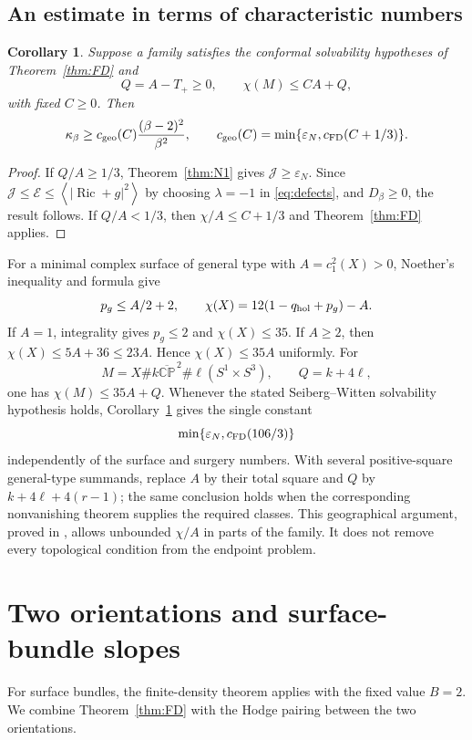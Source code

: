 \documentclass[11pt,a4paper]{article}
\newtheorem{corollary}[theorem]{Corollary}
\theoremstyle{definition}
\theoremstyle{remark}
\newcommand{\Ric}{\operatorname{Ric}}
\newcommand{\J}{\mathcal J}
\newcommand{\E}{\mathcal E}
\newcommand{\av}[1]{\left\langle#1\right\rangle}
\begin{document}
\subsection{An estimate in terms of characteristic numbers}
\begin{corollary}\label{cor:GEO}
Suppose a family satisfies the conformal solvability hypotheses of Theorem~\ref{thm:FD} and
\[
 Q=A-T_+\ge0,\qquad \chi(M)\le CA+Q,
\]
with fixed $C\ge0$. Then
\begin{equation}
 \kappa_\beta\ge c_{\rm geo}(C)\frac{(\beta-2)^2}{\beta^2},\qquad
 c_{\rm geo}(C)=\min\{\varepsilon_N,c_{\rm FD}(C+1/3)\}.
 \label{eq:GEO}
\end{equation}
\end{corollary}
\begin{proof}
If $Q/A\ge1/3$, Theorem~\ref{thm:N1} gives $\J\ge\varepsilon_N$. Since $\J\le\E\le\av{|\Ric+g|^2}$ by choosing $\lambda=-1$ in \eqref{eq:defects}, and $D_\beta\ge0$, the result follows. If $Q/A<1/3$, then $\chi/A\le C+1/3$ and Theorem~\ref{thm:FD} applies.
\end{proof}

For a minimal complex surface of general type with $A=c_1^2(X)>0$, Noether's inequality and formula give
\[
 p_g\le A/2+2,\qquad\chi(X)=12(1-q_{\rm hol}+p_g)-A.
\]
If $A=1$, integrality gives $p_g\le2$ and $\chi(X)\le35$. If $A\ge2$, then $\chi(X)\le5A+36\le23A$. Hence $\chi(X)\le35A$ uniformly. For
\[
 M=X\#k\overline{\mathbb{CP}}^{\,2}\#\ell(S^1\times S^3),
 \qquad Q=k+4\ell,
\]
one has $\chi(M)\le35A+Q$. Whenever the stated Seiberg--Witten solvability hypothesis holds, Corollary~\ref{cor:GEO} gives the single constant
\[
 \min\{\varepsilon_N,c_{\rm FD}(106/3)\}
\]
independently of the surface and surgery numbers. With several positive-square general-type summands, replace $A$ by their total square and $Q$ by $k+4\ell+4(r-1)$; the same conclusion holds when the corresponding nonvanishing theorem supplies the required classes. This geographical argument, proved in \cite{GEO}, allows unbounded $\chi/A$ in parts of the family. It does not remove every topological condition from the endpoint problem.

\section{Two orientations and surface-bundle slopes}
For surface bundles, the finite-density theorem applies with the fixed value $B=2$. We combine Theorem~\ref{thm:FD} with the Hodge pairing between the two orientations.
\end{document}
